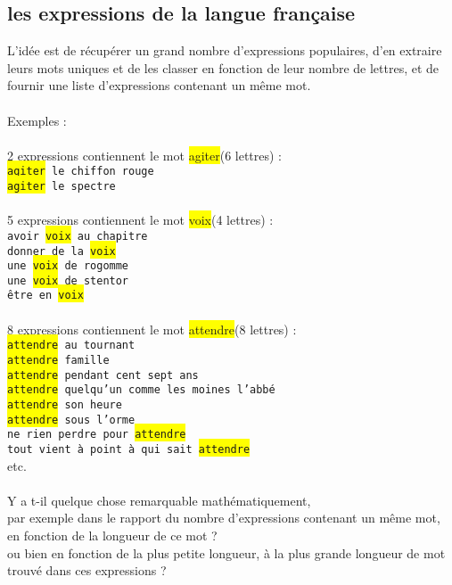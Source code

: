 \documentclass[french]{article}
\begin{document}
\subsection{les expressions de la langue française}
L'idée est de récupérer un grand nombre d'expressions populaires, d'en extraire leurs mots uniques et de les classer en fonction de leur nombre de lettres, et de fournir une liste d'expressions contenant un même mot.\\
\\Exemples :\\
\\2 expressions contiennent le mot \colorbox{yellow}{agiter}(6 lettres) :\\
\texttt{\colorbox{yellow}{agiter} le chiffon rouge\\
\colorbox{yellow}{agiter} le spectre}\\
\\5 expressions contiennent le mot \colorbox{yellow}{voix}(4 lettres) :\\
\texttt{avoir \colorbox{yellow}{voix} au chapitre\\
donner de la \colorbox{yellow}{voix}\\
une \colorbox{yellow}{voix} de rogomme\\
une \colorbox{yellow}{voix} de stentor\\
être en \colorbox{yellow}{voix}}\\
\\8 expressions contiennent le mot \colorbox{yellow}{attendre}(8 lettres) :\\
\texttt{\colorbox{yellow}{attendre} au tournant\\
\colorbox{yellow}{attendre} famille\\
\colorbox{yellow}{attendre} pendant cent sept ans\\
\colorbox{yellow}{attendre} quelqu'un comme les moines l'abbé\\
\colorbox{yellow}{attendre} son heure\\
\colorbox{yellow}{attendre} sous l'orme\\
ne rien perdre pour \colorbox{yellow}{attendre}\\
tout vient à point à qui sait \colorbox{yellow}{attendre}}\\
etc.\\
\\Y a t-il quelque chose remarquable mathématiquement,\\
par exemple dans le rapport du  nombre d'expressions contenant un même mot, en fonction de la longueur de ce mot ?\\
ou bien en fonction de la plus petite longueur, à la plus grande longueur de mot trouvé dans ces expressions ?\\
\newpage
\end{document}
